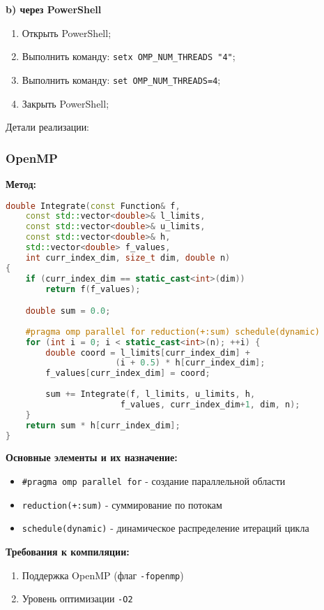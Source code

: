 \documentclass[14pt,a4paper]{article}
\begin{document}
\textbf{b) через PowerShell}

\begin{enumerate}
\item Открыть PowerShell;
\item Выполнить команду: \texttt{setx OMP\_NUM\_THREADS "4"};
\item Выполнить команду: \texttt{set OMP\_NUM\_THREADS=4};
\item Закрыть PowerShell;
\end{enumerate}


Детали реализации:
\subsubsection{OpenMP}

\textbf{Метод:}

\begin{framed}
\begin{lstlisting}[language=C++]
double Integrate(const Function& f, 
    const std::vector<double>& l_limits,
    const std::vector<double>& u_limits,
    const std::vector<double>& h,
    std::vector<double> f_values,
    int curr_index_dim, size_t dim, double n) 
{
    if (curr_index_dim == static_cast<int>(dim))
        return f(f_values);

    double sum = 0.0;
    
    #pragma omp parallel for reduction(+:sum) schedule(dynamic)
    for (int i = 0; i < static_cast<int>(n); ++i) {
        double coord = l_limits[curr_index_dim] + 
                      (i + 0.5) * h[curr_index_dim];
        f_values[curr_index_dim] = coord;
        
        sum += Integrate(f, l_limits, u_limits, h,
                       f_values, curr_index_dim+1, dim, n);
    }
    return sum * h[curr_index_dim];
}
\end{lstlisting}
\end{framed}

\textbf{Основные элементы и их назначение:}
\begin{itemize}
\item \texttt{\#pragma omp parallel for} - создание параллельной области
\item \texttt{reduction(+:sum)} - суммирование по потокам
\item \texttt{schedule(dynamic)} - динамическое распределение итераций цикла
\end{itemize}

\textbf{Требования к компиляции:}
\begin{enumerate}
\item Поддержка OpenMP (флаг \texttt{-fopenmp})
\item Уровень оптимизации \texttt{-O2}
\end{enumerate}
\end{document}
